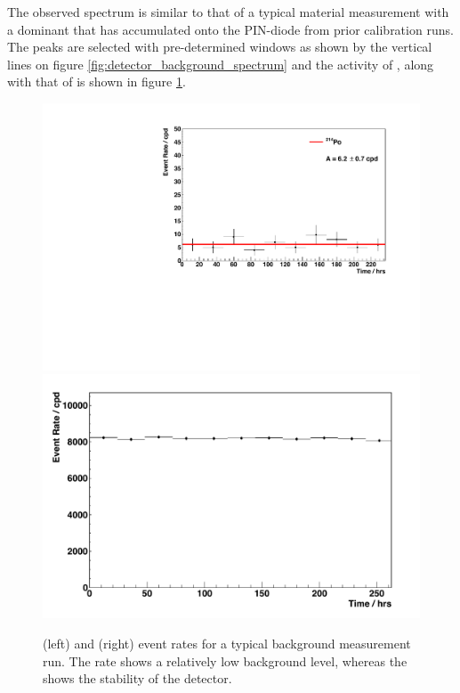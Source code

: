 The observed spectrum is similar to that of a typical material measurement with a dominant \PoTOZ{} that has accumulated onto the PIN-diode from prior calibration runs. The peaks are selected with pre-determined windows as shown by the vertical lines on figure \ref{fig:detector_background_spectrum} and the activity of \PoTOF{}, along with that of \PoTOZ{} is shown in figure \ref{fig:detector_background_rates}. 
%
\begin{figure}[t!]
    \centering
    \includegraphics[scale=0.43]{Chapter_4/Figures/det_background/Po214_det_background.pdf}
    \includegraphics[scale=0.43]{Chapter_4/Figures/det_background/Po210_det_background.pdf}
    \caption[\PoTOF{} and \PoTOZ{} event rates for a typical background measurement run.]
    {\PoTOF{} (left) and \PoTOZ{} (right) event rates for a typical background measurement run. The \PoTOF{} rate shows a relatively low background level, whereas the \PoTOZ{} shows the stability of the detector.}
    \label{fig:detector_background_rates}
\end{figure}
%

